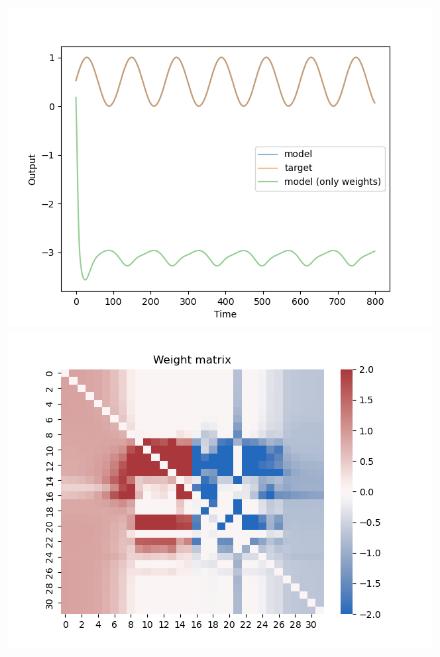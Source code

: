 \documentclass[12pt, a4paper]{article}
\begin{document}
\begin{figure}[H]
    \centering
    \includegraphics[width=\textwidth]{analysis/fig/0221_SIN2_bphcppt_output.png} \\
    \includegraphics[width=\textwidth]{analysis/fig/0221_SIN2_bphcppt_weight_matrix.png}
\end{figure}
\end{document}
